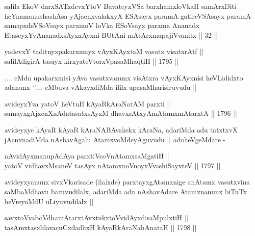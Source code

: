\begin{shl}
salila EkoV darxSATxdevxYtoV BavateyxVSa barxhamxloVkaH samArxDiti heYnamanushashAsa yAjacnxvalakxyX ESAsayx paramA gatireVSAsayx paramA samapxdeVSoV\s sayx paramoV loVka ESoV\s sayx parama Ananadx EtaseyxYvAnanadxsAyxnAyxni BUtAni mAtArxmupajiVvanitx || 32 ||
\end{shl}

\begin{shl}
yadevxY tadituyxpakarxmayx vAyxKAyxtaM vasutx visatxrAtf || \\
salilAdigirA tasayx kirxyateV\s torxVpasaMhaqtiH ||  1795 ||  
\end{shl}

\begin{artha}
\stext .... eMdu upakarxmisi yAva vasutxvanunx visAtxra vAyxKAyxnisi
heVLididxto adanunx `\stext'.... eMbuva vAkayxdiMda ililx
upasaMharisiruvudu ||
\end{artha}

\begin{shl}
avideyxYva yatoV heVtuH kAyaRkAraNatAM parxti || \\
samayxgAjxcnXnAdatasatxsAyxM dhavxsAtxyAmAtamxmAtarxtA ||  1796 ||  
\end{shl}

\begin{artha}
avideyxye kAyaR kAyaR kAraNABAvakekx kAraNa, adariMda adu tatxtxvX
jAcnxnadiMda nAshavAgalu AtamxvoMdeyAguvudu || aduheVgeMdare -
\end{artha}

\begin{shl}
nAvidAyxmanupAdAya parxtiVcoV\s nAtamxsaMgatiH || \\
yatoV vidhavxMsaneV tasAyx nA\s \s tamxnoV\s noyxV\s vashiSayxteV ||  1797 ||  
\end{shl}	

\begin{artha}
avideyxyanunx sivxVkarisade (ilalxde) parxtayxgAtamxnige anAtamx
vasutxvina saMbaMdhavu baruvudilalx, adariMda adu nAshavAdare
Atamxnanunx biTuTx beVreyoMdU uLiyuvudilalx ||
\end{artha}


\begin{shl}
savxtoV\s vaboVdhamAtarxtAvxtukxtoV\s vidAyxdisaMpulxtiH || \\
tasAmxtasxlilavacuCxdadhxH kAyaRkAraNahAnataH ||  1798 ||  
\end{shl}


